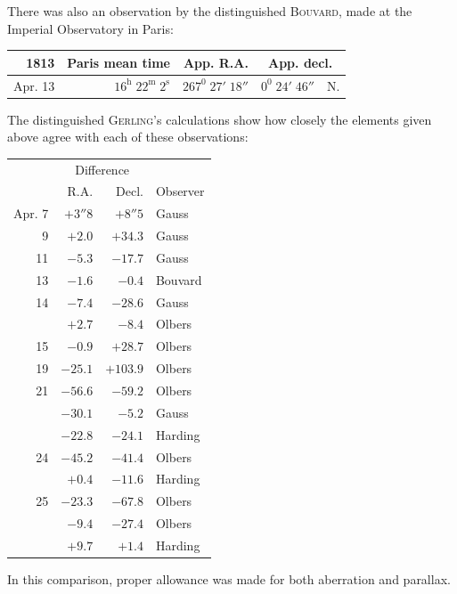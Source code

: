 There was also an observation by the distinguished \textsc{Bouvard}, made at the Imperial Observatory in Paris:
\begin{center}\small\setlength{\tabcolsep}{4pt}
\begin{tabular}{r|r|r|r l}
1813&Paris mean time&App. R.A.&\multicolumn{2}{c}{App. decl.}\\\hline
Apr. 13&$16^{\mathrm h}\;22^{\mathrm m}\;2^{\mathrm s}$&$267^0\;27'\;18''$&$0^0\;24'\;46''$&N.
\end{tabular}\end{center}

The distinguished \textsc{Gerling}’s calculations show how closely the elements given above agree with each of these observations:
\begin{center}\small\setlength{\tabcolsep}{6pt}
\begin{tabular}{r|r|r|l}
&\multicolumn{2}{c|}{Difference}&\\
&R.A.&Decl.&Observer\\\hline
Apr. 7&$+3''8$&$+8''5$&Gauss\\
9&$+2.0$&$+34.3$&Gauss\\
11&$-5.3$&$-17.7$&Gauss\\
13&$-1.6$&$-0.4$&Bouvard\\
14&$-7.4$&$-28.6$&Gauss\\
&$+2.7$&$-8.4$&Olbers\\
15&$-0.9$&$+28.7$&Olbers\\
19&$-25.1$&$+103.9$&Olbers\\
21&$-56.6$&$-59.2$&Olbers\\
&$-30.1$&$-5.2$&Gauss\\
&$-22.8$&$-24.1$&Harding\\
24&$-45.2$&$-41.4$&Olbers\\
&$+0.4$&$-11.6$&Harding\\
25&$-23.3$&$-67.8$&Olbers\\
&$-9.4$&$-27.4$&Olbers\\
&$+9.7$&$+1.4$&Harding
\end{tabular}\end{center}

In this comparison, proper allowance was made for both aberration and parallax.
\par\nobreak\smallskip
\noindent\makebox[\linewidth][c]{\rule{.225\linewidth}{.3pt}}\par\medskip

